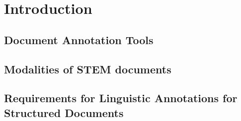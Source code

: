 \section{Introduction}

\subsection{Document Annotation Tools}

\subsection{Modalities of STEM documents}

\subsection {Requirements for Linguistic Annotations for Structured Documents}